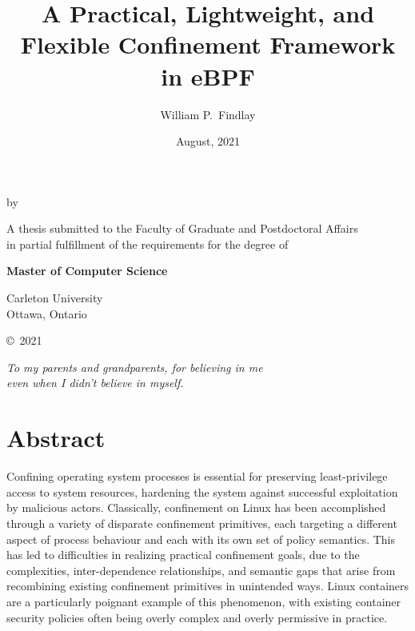 \documentclass[
  fontsize=12pt,
  titlepage=firstiscover,
  paper=letter,
oneside,
  cleardoublepage=plain,
  parskip=half-,
  DIV=10,
  parindent,
  appendixprefix,
  chapterprefix,
  listof=totoc,
]{scrbook}
\title{A Practical, Lightweight, and Flexible Confinement Framework in eBPF}
\author{William P.\ Findlay}
\date{August, 2021}
\begin{document}
\makeatletter
\begin{titlepage}
    \begin{center}
      \vspace*{1cm}
      {\LARGE\bfseries \@title}

      \vspace{1cm}
      by
      \vspace{1cm}

      {\itshape\large \@author\/}

      \vfill

      A thesis submitted to the Faculty of Graduate and Postdoctoral Affairs\\
      in partial fulfillment of the requirements for the degree of

      \vspace{3cm}
      {\bfseries Master of Computer Science}
      \vspace{3cm}


      {\@date}
      \vspace{0.5cm}

      Carleton University\\
      Ottawa, Ontario
      \vspace{0.5cm}

      \copyright{}~2021 \@author \end{center}
\end{titlepage}
\makeatother
\cleardoublepage

\renewcommand*{\titlepagestyle}{plain}

\frontmatter 

\vspace*{6em}
\begin{center}
\textit{To my parents and grandparents, for believing in me\\even when I didn't believe in myself.}
\end{center}
\vspace*{\fill}

\chapter*{Abstract}\begingroup
\small
Confining operating system processes is essential for preserving least-privilege access to
system resources, hardening the system against successful exploitation by malicious
actors. Classically, confinement on Linux has been accomplished through a variety of
disparate confinement primitives, each targeting a different aspect of process behaviour
and each with its own set of policy semantics. This has led to difficulties in realizing
practical confinement goals, due to the complexities, inter-dependence relationships, and
semantic gaps that arise from recombining existing confinement primitives in unintended
ways. Linux containers are a particularly poignant example of this phenomenon, with
existing container security policies often being overly complex and overly permissive in
practice.
\end{document}
